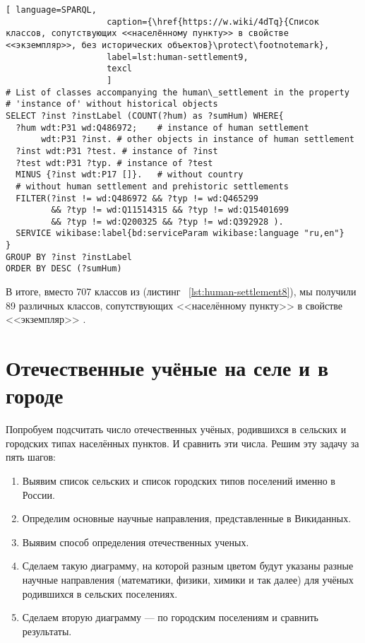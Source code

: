 \lstset{numbers=left, firstnumber=1, frame=single}
\begin{lstlisting}[ language=SPARQL, 
                    caption={\href{https://w.wiki/4dTq}{Cписок классов, сопутствующих <<населённому пункту>> в свойстве <<экземпляр>>, без исторических объектов}\protect\footnotemark},
                    label=lst:human-settlement9,
                    texcl 
                    ]
# List of classes accompanying the human\_settlement in the property
# 'instance of' without historical objects 
SELECT ?inst ?instLabel (COUNT(?hum) as ?sumHum) WHERE{
  ?hum wdt:P31 wd:Q486972;    # instance of human settlement
       wdt:P31 ?inst. # other objects in instance of human settlement
  ?inst wdt:P31 ?test. # instance of ?inst
  ?test wdt:P31 ?typ. # instance of ?test
  MINUS {?inst wdt:P17 []}.   # without country
  # without human settlement and prehistoric settlements
  FILTER(?inst != wd:Q486972 && ?typ != wd:Q465299 
         && ?typ != wd:Q11514315 && ?typ != wd:Q15401699 
         && ?typ != wd:Q200325 && ?typ != wd:Q392928 ). 
  SERVICE wikibase:label{bd:serviceParam wikibase:language "ru,en"}
}
GROUP BY ?inst ?instLabel
ORDER BY DESC (?sumHum)
\end{lstlisting}%

В итоге, вместо 707 классов из (листинг ~\protect\ref{lst:human-settlement8}), мы получили 89 различных классов, сопутствующих <<населённому пункту>> в свойстве <<экземпляр>> . 

\section{Отечественные учёные на селе и в городе}

Попробуем подсчитать число отечественных учёных, родившихся в сельских и городских типах населённых пунктов. И сравнить эти числа.
Решим эту задачу за пять шагов:
\begin{enumerate}
  \item Выявим список сельских и список городских типов поселений именно в России.
  \item Определим основные научные направления, представленные в Викиданных.
  \item Выявим способ определения отечественных ученых.
  \item Сделаем такую диаграмму, на которой разным цветом будут указаны разные научные направления (математики, физики, химики и так далее) для учёных родившихся в сельских поселениях.
  \item Сделаем вторую диаграмму — по городским поселениям и сравнить результаты.
\end{enumerate}

